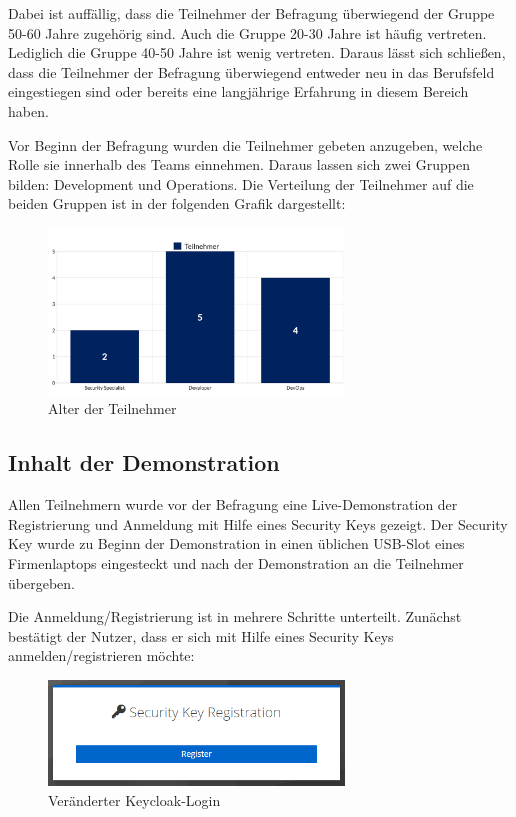 Dabei ist auffällig, dass die Teilnehmer der Befragung überwiegend der Gruppe 50-60 Jahre zugehörig sind. Auch die Gruppe 20-30 Jahre ist häufig vertreten. Lediglich die Gruppe 40-50 Jahre ist wenig vertreten. Daraus lässt sich schließen, dass die Teilnehmer der Befragung überwiegend entweder neu in das Berufsfeld eingestiegen sind oder bereits eine langjährige Erfahrung in diesem Bereich haben. 

Vor Beginn der Befragung wurden die Teilnehmer gebeten anzugeben, welche Rolle sie innerhalb des Teams einnehmen. Daraus lassen sich zwei Gruppen bilden: Development und Operations. Die Verteilung der Teilnehmer auf die beiden Gruppen ist in der folgenden Grafik dargestellt:

\begin{figure}[h]
	\centering 
	\includegraphics[width=0.7\textwidth]{img/abbildungen/chart_rollen.png}
	\captionsetup{format=hang}
	\caption{Alter der Teilnehmer}
\end{figure}

\subsection{Inhalt der Demonstration}
Allen Teilnehmern wurde vor der Befragung eine Live-Demonstration der Registrierung und Anmeldung mit Hilfe eines Security Keys gezeigt. Der Security Key wurde zu Beginn der Demonstration in einen üblichen USB-Slot eines Firmenlaptops eingesteckt und nach der Demonstration an die Teilnehmer übergeben. 

Die Anmeldung/Registrierung ist in mehrere Schritte unterteilt. Zunächst bestätigt der Nutzer, dass er sich mit Hilfe eines Security Keys anmelden/registrieren möchte:

\begin{figure}[h]
	\centering 
	\includegraphics[width=0.7\textwidth]{img/abbildungen/reg001.png}
	\captionsetup{format=hang}
	\caption{Veränderter Keycloak-Login}
\end{figure}

